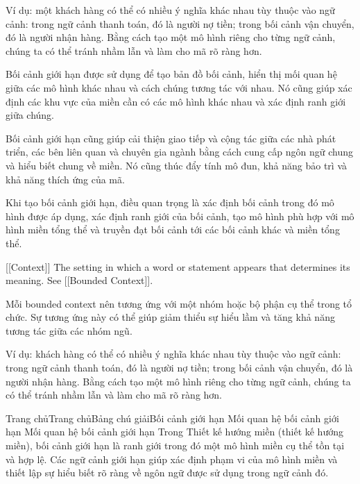 Ví dụ: một khách hàng có thể có nhiều ý nghĩa khác nhau tùy thuộc vào ngữ cảnh: trong ngữ cảnh thanh toán, đó là người nợ tiền; trong bối cảnh vận chuyển, đó là người nhận hàng. Bằng cách tạo một mô hình riêng cho từng ngữ cảnh, chúng ta có thể tránh nhầm lẫn và làm cho mã rõ ràng hơn.

Bối cảnh giới hạn được sử dụng để tạo bản đồ bối cảnh, hiển thị mối quan hệ giữa các mô hình khác nhau và cách chúng tương tác với nhau. Nó cũng giúp xác định các khu vực của miền cần có các mô hình khác nhau và xác định ranh giới giữa chúng.

Bối cảnh giới hạn cũng giúp cải thiện giao tiếp và cộng tác giữa các nhà phát triển, các bên liên quan và chuyên gia ngành bằng cách cung cấp ngôn ngữ chung và hiểu biết chung về miền. Nó cũng thúc đẩy tính mô đun, khả năng bảo trì và khả năng thích ứng của mã.

Khi tạo bối cảnh giới hạn, điều quan trọng là xác định bối cảnh trong đó mô hình được áp dụng, xác định ranh giới của bối cảnh, tạo mô hình phù hợp với mô hình miền tổng thể và truyền đạt bối cảnh tới các bối cảnh khác và miền tổng thể.

[[Context]] The setting in which a word or statement appears that determines its meaning. See [[Bounded Context]].

Mỗi bounded context nên tương ứng với một nhóm hoặc bộ phận cụ thể trong tổ chức. Sự tương ứng này có thể giúp giảm thiểu sự hiểu lầm và tăng khả năng tương tác giữa các nhóm ngũ.

Ví dụ: khách hàng có thể có nhiều ý nghĩa khác nhau tùy thuộc vào ngữ cảnh: trong ngữ cảnh thanh toán, đó là người nợ tiền; trong bối cảnh vận chuyển, đó là người nhận hàng. Bằng cách tạo một mô hình riêng cho từng ngữ cảnh, chúng ta có thể tránh nhầm lẫn và làm cho mã rõ ràng hơn.


Trang chủTrang chủBảng chú giảiBối cảnh giới hạn Mối quan hệ bối cảnh giới hạn
Mối quan hệ bối cảnh giới hạn
Trong Thiết kế hướng miền (thiết kế hướng miền), bối cảnh giới hạn là ranh giới trong đó một mô hình miền cụ thể tồn tại và hợp lệ. Các ngữ cảnh giới hạn giúp xác định phạm vi của mô hình miền và thiết lập sự hiểu biết rõ ràng về ngôn ngữ được sử dụng trong ngữ cảnh đó.

